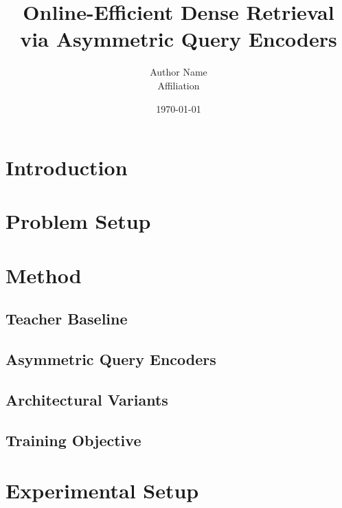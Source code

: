 \documentclass[11pt]{article}
\title{Online-Efficient Dense Retrieval via Asymmetric Query Encoders}
\author{Author Name \\ Affiliation}
\date{\today}
\begin{document}
\maketitle

\begin{abstract}
\end{abstract}

\section{Introduction}

\section{Problem Setup}

\section{Method}
\subsection{Teacher Baseline}

\subsection{Asymmetric Query Encoders}

\subsection{Architectural Variants}

\subsection{Training Objective}

\section{Experimental Setup}
\end{document}
